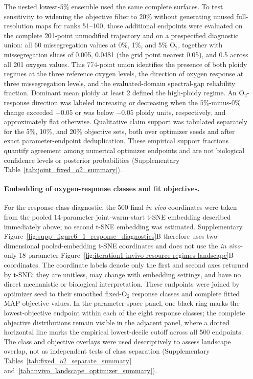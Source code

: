 \documentclass[11pt]{article}
\begin{document}
The nested lowest-5\% ensemble used the same complete surfaces. To test sensitivity to widening the objective filter to 20\% without generating unused full-resolution maps for ranks 51--100, those additional endpoints were evaluated on the complete 201-point unmodified trajectory and on a prespecified diagnostic union: all 60 missegregation values at 0\%, 1\%, and 5\% O$_2$, together with missegregation slices of 0.005, 0.0481 (the grid point nearest 0.05), and 0.5 across all 201 oxygen values. This 774-point union identifies the presence of both ploidy regimes at the three reference oxygen levels, the direction of oxygen response at three missegregation levels, and the evaluated-domain spectral-gap reliability fraction. Dominant mean ploidy at least 2 defined the high-ploidy regime. An O$_2$-response direction was labeled increasing or decreasing when the 5\%-minus-0\% change exceeded $+0.05$ or was below $-0.05$ ploidy units, respectively, and approximately flat otherwise. Qualitative claim support was tabulated separately for the 5\%, 10\%, and 20\% objective sets, both over optimizer seeds and after exact parameter-endpoint deduplication. These empirical support fractions quantify agreement among numerical optimizer endpoints and are not biological confidence levels or posterior probabilities (Supplementary Table~\ref{tab:joint_fixed_o2_summary}).

\paragraph{Embedding of oxygen-response classes and fit objectives.}
For the response-class diagnostic, the 500 final \textit{in vivo} coordinates were taken from the pooled 14-parameter joint-warm-start t-SNE embedding described immediately above; no second t-SNE embedding was estimated. Supplementary Figure~\ref{fig:supp_figure6_1_response_diagnostics}B therefore uses two-dimensional pooled-embedding t-SNE coordinates and does not use the \textit{in vivo}-only 18-parameter Figure~\ref{fig:iteration1-invivo-resource-regimes-landscape}B coordinates. The coordinate labels denote only the first and second axes returned by t-SNE: they are unitless, may change with embedding settings, and have no direct mechanistic or biological interpretation. These endpoints were joined by optimizer seed to their smoothed fixed-O$_2$ response classes and complete fitted MAP objective values. In the parameter-space panel, one black ring marks the lowest-objective endpoint within each of the eight response classes; the complete objective distributions remain visible in the adjacent panel, where a dotted horizontal line marks the empirical lowest-decile cutoff across all 500 endpoints. The class and objective overlays were used descriptively to assess landscape overlap, not as independent tests of class separation (Supplementary Tables~\ref{tab:fixed_o2_separate_summary} and~\ref{tab:invivo_landscape_optimizer_summary}).
\end{document}
